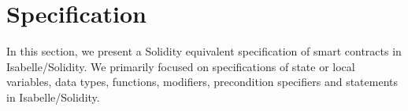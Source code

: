 \documentclass[a4paper,UKenglish,cleveref, autoref, thm-restate]{oasics-v2021}
\begin{document}
%
%
%

%
%
%
\section{Specification}
In this section, we present a Solidity equivalent specification of smart contracts in Isabelle/Solidity. 
%
We primarily focused on specifications of state or local variables, data types, functions, modifiers, precondition specifiers and statements in Isabelle/Solidity.
\end{document}
